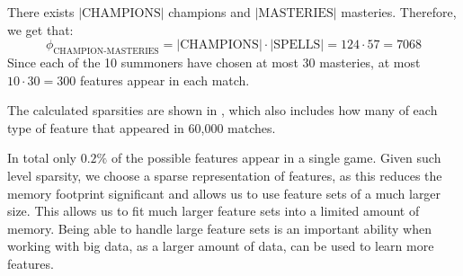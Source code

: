 There exists $|\text{CHAMPIONS}|$ champions and $|\text{MASTERIES}|$ masteries. Therefore, we get that:
\[\phi_{\text{CHAMPION-MASTERIES}} = |\text{CHAMPIONS}| \cdot |\text{SPELLS}| = 124 \cdot 57 = 7068\]
Since each of the 10 summoners have chosen at most 30 masteries, at most $10 \cdot 30 = 300$ features appear in each match.

  \begin{table}[!htb]
    \centering
    \caption{The sparsity of each type of feature. (*)At most.}\label{tab:featuresparsity}
  \end{table}

The calculated sparsities are shown in , which also includes how many of each type of feature that appeared in 60,000 matches.

In total only $0.2\%$ of the possible features appear in a single game. Given such level sparsity, we choose a sparse representation of features, as this reduces the memory footprint significant and allows us to use feature sets of a much larger size. This allows us to fit much larger feature sets into a limited amount of memory. Being able to handle large feature sets is an important ability when working with big data, as a larger amount of data, can be used to learn more features.
